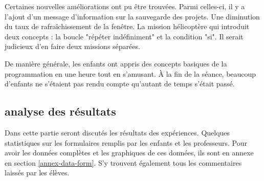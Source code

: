Certaines nouvelles améliorations ont pu être trouvées. Parmi celles-ci, il y a l'ajout d'un message d'information sur la sauvegarde des projets. Une diminution du taux de rafraîchissement de la fenêtre. La mission hélicoptère qui introduit deux concepts : la boucle "répéter indéfiniment" et la condition "si". Il serait judicieux d'en faire deux missions séparées.

De manière générale, les enfants ont appris des concepts basiques de la programmation en une heure tout en s'amusant. À la fin de la séance, beaucoup d'enfants ne s'étaient pas rendu compte qu'autant de temps s'était passé.
\subsection{analyse des résultats}
Dans cette partie seront discutés les résultats des expériences. Quelques statistiques sur les formulaires remplis par les enfants et les professeurs. Pour avoir les données complètes et les graphiques de ces données, ils sont en annexe en section \ref{annex-data-form}. S'y trouvent également tous les commentaires laissés par les élèves.

